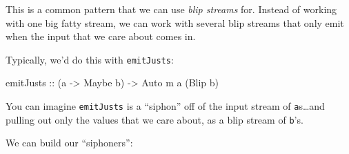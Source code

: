 \documentclass[]{article}
\newenvironment{Shaded}{}{}
\newcommand{\CommentTok}[1]{\textcolor[rgb]{0.38,0.63,0.69}{\textit{#1}}}
\newcommand{\DataTypeTok}[1]{\textcolor[rgb]{0.56,0.13,0.00}{#1}}
\newcommand{\FunctionTok}[1]{\textcolor[rgb]{0.02,0.16,0.49}{#1}}
\newcommand{\NormalTok}[1]{#1}
\newcommand{\OperatorTok}[1]{\textcolor[rgb]{0.40,0.40,0.40}{#1}}
\newcommand{\OtherTok}[1]{\textcolor[rgb]{0.00,0.44,0.13}{#1}}
\begin{document}
This is a common pattern that we can use \emph{blip streams} for. Instead of
working with one big fatty stream, we can work with several blip streams that
only emit when the input that we care about comes in.

Typically, we'd do this with \texttt{emitJusts}:

\begin{Shaded}
\begin{Highlighting}[]
\OtherTok{emitJusts ::}\NormalTok{ (a }\OtherTok{{-}>} \DataTypeTok{Maybe}\NormalTok{ b) }\OtherTok{{-}>} \DataTypeTok{Auto}\NormalTok{ m a (}\DataTypeTok{Blip}\NormalTok{ b)}
\end{Highlighting}
\end{Shaded}

You can imagine \texttt{emitJusts} is a ``siphon'' off of the input stream of
\texttt{a}s\ldots and pulling out only the values that we care about, as a blip
stream of \texttt{b}'s.

We can build our ``siphoners'':

\begin{Shaded}
\end{Shaded}
\end{document}
